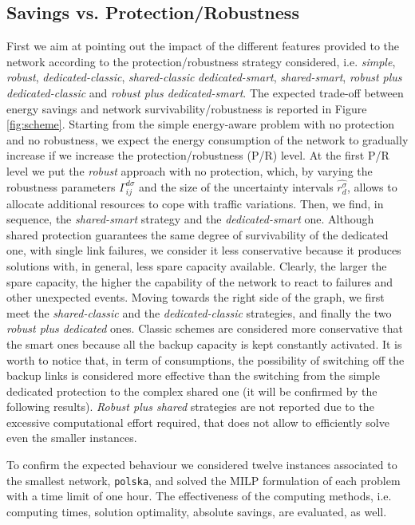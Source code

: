 \documentclass[final,5p,times,twocolumn]{elsarticle}
\begin{document}
\subsection{Savings vs. Protection/Robustness}\label{sec:rob_prot}First we aim at pointing out the impact of the different features provided to the network according to the protection/robustness strategy considered, i.e. \textit{simple}, \textit{robust}, \textit{dedicated-classic}, \textit{shared-classic} \textit{dedicated-smart}, \textit{shared-smart}, \textit{robust plus dedicated-classic} and  \textit{robust plus dedicated-smart}. The expected trade-off between energy savings and network survivability/robustness is reported in Figure \ref{fig:scheme}.
Starting from the simple energy-aware problem with no protection and no robustness, we expect the energy consumption of the network to gradually increase  if we increase the protection/robustness (P/R) level. At the first P/R level we put the \textit{robust} approach with no protection, which, by varying the robustness parameters $\Gamma_{ij}^{d\sigma}$  and the size of the uncertainty intervals $\hat{r_d^{\sigma}}$, allows to allocate additional resources to cope with traffic variations. Then, we find, in sequence,  the \textit{shared-smart} strategy and the \textit{dedicated-smart} one. Although shared protection guarantees the same degree of survivability of the dedicated one, with single link failures, we consider it less conservative because it produces solutions with, in general, less spare capacity available. Clearly, the larger  the spare capacity, the higher the capability of the network to react to failures and other unexpected events. Moving towards the right side of the graph, we first meet the \textit{shared-classic} and the \textit{dedicated-classic} strategies, and finally the two \textit{robust plus dedicated} ones. Classic schemes are considered more conservative that the smart ones because all the backup capacity is kept constantly activated. It is worth to notice that, in term of consumptions, the possibility of switching off the backup links is considered more effective than the switching from the simple dedicated protection to the complex shared one (it will be confirmed by the following results).  \textit{Robust plus shared} strategies are not reported due to the excessive computational effort required, that does not allow to efficiently solve even the smaller instances. 

To confirm the expected behaviour we considered twelve instances associated to the smallest network,  {\tt polska}, and solved the MILP formulation of each problem with a time limit of one hour.  The effectiveness of the computing methods, i.e. computing times, solution optimality, absolute savings, are evaluated, as well.
\end{document}
